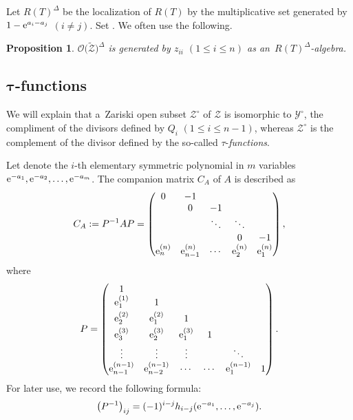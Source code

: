 \documentclass[10pt,a4paper]{amsart}
\numberwithin{equation}{section}
\newcommand{\reg}{\Delta}
\newcommand{\Rep}{{R(T)}}
\newtheorem{Proposition}[Theorem]{Proposition}
\theoremstyle{definition}
\begin{document}
Let $\Rep^\reg$ be the localization of $\Rep$ by
the multiplicative set generated by $1-{\rm e}^{a_i-a_j}$ $(i\ne j)$.
Set \smash{$\mathscr{O}\bigl(\tilde{\mathscr{Z}}\bigr)^\reg
:=\Rep^\reg\otimes_{\Rep}\mathscr{O}\bigl(\tilde{\mathscr{Z}}\bigr)$}.
We often use the following.
\begin{Proposition}\label{prop:OZ_Delta}
$\mathscr{O}\bigl(\tilde{\mathscr{Z}}\bigr)^\reg$
is generated by $z_{ii}$ $(1\le i\le n)$ as
an~$\Rep^\reg$-algebra.
\end{Proposition}

\subsection[tau-functions]{$\boldsymbol{\tau}$-functions}\label{sec:tau}
We will explain that a~Zariski open subset $\mathscr{Z}^\circ$ of $\mathscr{Z}$ is isomorphic to
$\mathscr{Y}^\circ$, the compliment of the divisors defined by $Q_i$ $(1\le i\le n-1)$, whereas
$\mathscr{Z}^\circ$ is the complement of the divisor defined by the so-called $\tau$-\emph{functions}.

Let  denote the $i$-th elementary symmetric polynomial in $m$ variables ${\rm e}^{-a_1},{\rm e}^{-a_2},\dots,{\rm e}^{-a_m}$.
The companion matrix $C_A$ of $A$ is described as
\begin{equation}
\label{eq:C_A}
C_A:=P^{-1}AP
=\begin{pmatrix}
0& -1 \\
&0& -1 \\
& & \ddots&\ddots \\
&& & 0&-1\\
{\rm e}^{(n)}_n& {\rm e}^{(n)}_{n-1}&\cdots &{\rm e}^{(n)}_2&{\rm e}^{(n)}_1\\
\end{pmatrix},
\end{equation}
where
\begin{equation}
\label{eq:P}
P=
\begin{pmatrix}
1\\
{\rm e}^{(1)}_1 & 1\\[1mm]
{\rm e}^{(2)}_2 & {\rm e}^{(2)}_1 & 1\\[1mm]
{\rm e}^{(3)}_3 & {\rm e}^{(3)}_2 & {\rm e}^{(3)}_1&1\\[1mm]
\vdots & \vdots & \vdots & & \ddots\\
{\rm e}^{(n-1)}_{n-1}& {\rm e}^{(n-1)}_{n-2}&\cdots &\cdots&{\rm e}^{(n-1)}_1 & 1
\end{pmatrix}.
\end{equation}
For later use, we record the following formula:
\[
 \bigl(P^{-1}\bigr)_{ij}=(-1)^{i-j}h_{i-j}({\rm e}^{-a_1},\dots,{\rm e}^{-a_{j}}).
\]
\end{document}
